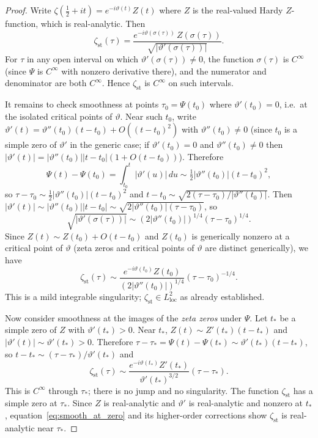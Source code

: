\documentclass[11pt]{article}
\theoremstyle{definition}
\begin{document}
\begin{proof}
Write $\zeta(\tfrac12+it)=e^{-i\vartheta(t)}Z(t)$ where $Z$ is the
real-valued Hardy $Z$-function, which is real-analytic.  Then
\begin{equation}\label{eq:zst_Z}
\zeta_{\mathrm{st}}(\tau)
=\frac{e^{-i\vartheta(\sigma(\tau))}\,Z(\sigma(\tau))}
      {\sqrt{|\vartheta'(\sigma(\tau))|}}.
\end{equation}
For $\tau$ in any open interval on which $\vartheta'(\sigma(\tau))\ne 0$,
the function $\sigma(\tau)$ is $C^\infty$ (since $\Psi$ is $C^\infty$
with nonzero derivative there), and the numerator and denominator are
both $C^\infty$.  Hence $\zeta_{\mathrm{st}}$ is $C^\infty$ on such
intervals.

It remains to check smoothness at points $\tau_0=\Psi(t_0)$ where
$\vartheta'(t_0)=0$, i.e.\ at the isolated critical points of
$\vartheta$.  Near such $t_0$, write
$\vartheta'(t)=\vartheta''(t_0)(t-t_0)+O((t-t_0)^2)$ with
$\vartheta''(t_0)\ne 0$ (since $t_0$ is a simple zero of $\vartheta'$
in the generic case; if $\vartheta'(t_0)=0$ and $\vartheta''(t_0)\ne 0$
then $|\vartheta'(t)|=|\vartheta''(t_0)||t-t_0|(1+O(t-t_0))$).
Therefore
\[
\Psi(t)-\Psi(t_0)=\int_{t_0}^t|\vartheta'(u)|\,du
\sim\tfrac12|\vartheta''(t_0)|(t-t_0)^2,
\]
so $\tau-\tau_0\sim\tfrac12|\vartheta''(t_0)|(t-t_0)^2$ and
$t-t_0\sim\sqrt{2(\tau-\tau_0)/|\vartheta''(t_0)|}$.  Then
$|\vartheta'(t)|\sim|\vartheta''(t_0)||t-t_0|
\sim\sqrt{2|\vartheta''(t_0)|(\tau-\tau_0)}$, so
\[
\sqrt{|\vartheta'(\sigma(\tau))|}
\sim(2|\vartheta''(t_0)|)^{1/4}(\tau-\tau_0)^{1/4}.
\]
Since $Z(t)\sim Z(t_0)+O(t-t_0)$ and $Z(t_0)$ is generically nonzero
at a critical point of $\vartheta$ (zeta zeros and critical points of
$\vartheta$ are distinct generically), we have
\[
\zeta_{\mathrm{st}}(\tau)\sim
\frac{e^{-i\vartheta(t_0)}Z(t_0)}{(2|\vartheta''(t_0)|)^{1/4}}
(\tau-\tau_0)^{-1/4}.
\]
This is a mild integrable singularity; $\zeta_{\mathrm{st}}\in L^2_{\mathrm{loc}}$
as already established.

\medskip
Now consider smoothness at the images of the \emph{zeta zeros} under
$\Psi$.  Let $t_*$ be a simple zero of $Z$ with $\vartheta'(t_*)>0$.
Near $t_*$, $Z(t)\sim Z'(t_*)(t-t_*)$ and $|\vartheta'(t)|
\sim\vartheta'(t_*)>0$.  Therefore
$\tau-\tau_*=\Psi(t)-\Psi(t_*)\sim\vartheta'(t_*)(t-t_*)$, so
$t-t_*\sim(\tau-\tau_*)/\vartheta'(t_*)$ and
\begin{equation}\label{eq:smooth_at_zero}
\zeta_{\mathrm{st}}(\tau)
\sim\frac{e^{-i\vartheta(t_*)}Z'(t_*)}
         {\vartheta'(t_*)^{3/2}}(\tau-\tau_*).
\end{equation}
This is $C^\infty$ through $\tau_*$; there is no jump and no
singularity.  The function $\zeta_{\mathrm{st}}$ has a simple zero at
$\tau_*$.  Since $Z$ is real-analytic and $\vartheta'$ is real-analytic
and nonzero at $t_*$, equation~\eqref{eq:smooth_at_zero} and its
higher-order corrections show $\zeta_{\mathrm{st}}$ is real-analytic
near $\tau_*$.


\end{proof}
\end{document}
